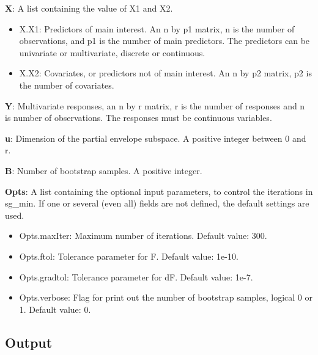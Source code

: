 \documentclass[a4paper,11pt,openany]{memoir}
\begin{document}
\begin{par}
\textbf{X}: A list containing the value of X1 and X2.
\end{par} \vspace{1em}
\begin{itemize}
\setlength{\itemsep}{-1ex}
   \item X.X1: Predictors of main interest. An n by p1 matrix, n is the number of observations, and p1 is the number of main predictors. The predictors can be univariate or multivariate, discrete or continuous.
   \item X.X2: Covariates, or predictors not of main interest.  An n by p2 matrix, p2 is the number of covariates.
\end{itemize}
\begin{par}
\textbf{Y}: Multivariate responses, an n by r matrix, r is the number of responses and n is number of observations.  The responses must be continuous variables.
\end{par} \vspace{1em}
\begin{par}
\textbf{u}: Dimension of the partial envelope subspace.  A positive integer between 0 and r.
\end{par} \vspace{1em}
\begin{par}
\textbf{B}: Number of bootstrap samples.  A positive integer.
\end{par} \vspace{1em}
\begin{par}
\textbf{Opts}: A list containing the optional input parameters, to control the iterations in sg\_min. If one or several (even all) fields are not defined, the default settings are used.
\end{par} \vspace{1em}
\begin{itemize}
\setlength{\itemsep}{-1ex}
   \item Opts.maxIter: Maximum number of iterations.  Default value: 300.
   \item Opts.ftol: Tolerance parameter for F.  Default value: 1e-10.
   \item Opts.gradtol: Tolerance parameter for dF.  Default value: 1e-7.
   \item Opts.verbose: Flag for print out the number of bootstrap samples, logical 0 or 1. Default value: 0.
\end{itemize}


\subsection*{Output}
\end{document}
